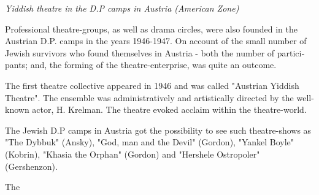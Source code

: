 \documentclass{article}
\begin{document}
\begin{pairs}
\begin{Leftside}
\begin{english}
\beginnumbering
\autopar
\emph{
Yiddish theatre in the D.P camps in Austria (American Zone)
}
\newline 
 
Professional theatre-groups, as well as drama circles, were also founded in the Austrian D.P. camps in the years 1946-1947.
On account of the small number of Jewish survivors who found themselves in Austria - both the number of participants; and, the forming of
the theatre-enterprise, was quite an outcome.

The first theatre collective appeared in 1946 and was called "Austrian Yiddish Theatre". The ensemble was administratively and 
artistically directed by the well-known actor, H. Krelman. The theatre evoked acclaim within the theatre-world.

The Jewish D.P camps in Austria got the possibility to see such theatre-shows as "The Dybbuk" (Ansky),
"God, man and the Devil" (Gordon), "Yankel Boyle" (Kobrin), "Khasia the Orphan" (Gordon) and "Hershele Ostropoler" (Gershenzon).

The

\endnumbering
\end{english}
\end{Leftside}

\end{pairs}
\Columns
\end{document}

